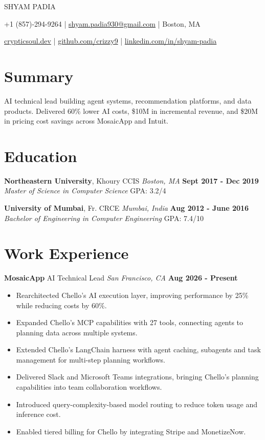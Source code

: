\documentclass[10pt, letterpaper]{article}
\newcommand{\name}[1]{\centerline{\Large \scshape {#1}}}
\newcommand{\contactinfo}[1]{\centerline{\small #1}}
\newcommand{\educationentry}[4]{
  \noindent\textbf{#1}, #2 \hfill \textit{#3} \hfill \textbf{#4}
}
\newcommand{\jobentry}[4]{
  \noindent\textbf{#1} \hfill #2 \hfill \textit{#3} \hfill \textbf{#4}
}
\begin{document}
\name{SHYAM PADIA}
\contactinfo{
	+1 (857)-294-9264 |
	\href{mailto:shyam.padia930@gmail.com}{shyam.padia930@gmail.com} |
	Boston, MA
}
\contactinfo{
	\href{https://crypticsoul.dev}{crypticsoul.dev} |
	\href{https://github.com/crizzy9}{github.com/crizzy9} |
	\href{https://linkedin.com/in/shyam-padia}{linkedin.com/in/shyam-padia}
}

\section{Summary}
AI technical lead building agent systems, recommendation platforms, and data products. Delivered 60\% lower AI costs, \$10M in incremental revenue, and \$20M in pricing cost savings across MosaicApp and Intuit.

\section{Education}

\educationentry{Northeastern University}{Khoury CCIS}{Boston, MA}{Sept 2017 - Dec 2019}\\
\textit{Master of Science in Computer Science} \hfill GPA: 3.2/4


\educationentry{University of Mumbai}{Fr. CRCE}{Mumbai, India}{Aug 2012 - June 2016}\\
\textit{Bachelor of Engineering in Computer Engineering} \hfill GPA: 7.4/10

\section{Work Experience}

\jobentry{MosaicApp}{AI Technical Lead}{San Francisco, CA}{Aug 2026 - Present}
\begin{itemize}
	\item Rearchitected Chello's AI execution layer, improving performance by 25\% while reducing costs by 60\%.
	\item Expanded Chello's MCP capabilities with 27 tools, connecting agents to planning data across multiple systems.
	\item Extended Chello's LangChain harness with agent caching, subagents and task management for multi-step planning workflows.
	\item Delivered Slack and Microsoft Teams integrations, bringing Chello's planning capabilities into team collaboration workflows.
	\item Introduced query-complexity-based model routing to reduce token usage and inference cost.
	\item Enabled tiered billing for Chello by integrating Stripe and MonetizeNow.
\end{itemize}
\end{document}
